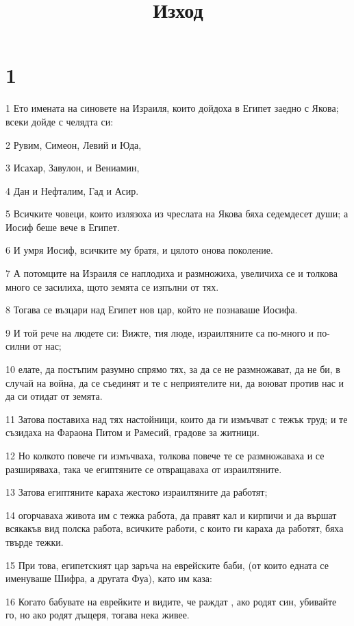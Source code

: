 

\title{Изход}


\chapter{1}

\par 1 Ето имената на синовете на Израиля, които дойдоха в Египет заедно с Якова; всеки дойде с челядта си:
\par 2 Рувим, Симеон, Левий и Юда,
\par 3 Исахар, Завулон, и Вениамин,
\par 4 Дан и Нефталим, Гад и Асир.
\par 5 Всичките човеци, които излязоха из чреслата на Якова бяха седемдесет души; а Иосиф беше вече в Египет.
\par 6 И умря Иосиф, всичките му братя, и цялото онова поколение.
\par 7 А потомците на Израиля се наплодиха и размножиха, увеличиха се и толкова много се засилиха, щото земята се изпълни от тях.
\par 8 Тогава се възцари над Египет нов цар, който не познаваше Иосифа.
\par 9 И той рече на людете си: Вижте, тия люде, израилтяните са по-много и по-силни от нас;
\par 10 елате, да постъпим разумно спрямо тях, за да се не размножават, да не би, в случай на война, да се съединят и те с неприятелите ни, да воюват против нас и да си отидат от земята.
\par 11 Затова поставиха над тях настойници, които да ги измъчват с тежък труд; и те съзидаха на Фараона Питом и Рамесий, градове за житници.
\par 12 Но колкото повече ги измъчваха, толкова повече те се размножаваха и се разширяваха, така че египтяните се отвращаваха от израилтяните.
\par 13 Затова египтяните караха жестоко израилтяните да работят;
\par 14 огорчаваха живота им с тежка работа, да правят кал и кирпичи и да вършат всякакъв вид полска работа, всичките работи, с които ги караха да работят, бяха твърде тежки.
\par 15 При това, египетският цар заръча на еврейските баби, (от които едната се именуваше Шифра, а другата Фуа), като им каза:
\par 16 Когато бабувате на еврейките и видите, че раждат , ако родят син, убивайте го, но ако родят дъщеря, тогава нека живее.
